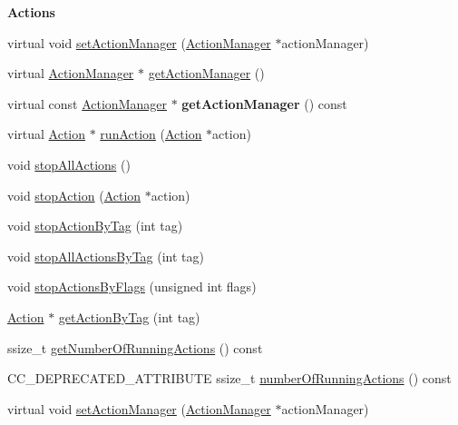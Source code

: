 \begin{Indent}\textbf{ Actions}\par
\begin{DoxyCompactItemize}
\item 
virtual void \hyperlink{classNode_a2807ac202214bee721a75c098da54bc6}{set\+Action\+Manager} (\hyperlink{classActionManager}{Action\+Manager} $\ast$action\+Manager)
\item 
virtual \hyperlink{classActionManager}{Action\+Manager} $\ast$ \hyperlink{classNode_a4e089841bc08a8753c65b7bb4f96aac5}{get\+Action\+Manager} ()
\item 
\mbox{\label{classNode_a5f453eebf3bf1a7a46ef4369f40ee8f1}} 
virtual const \hyperlink{classActionManager}{Action\+Manager} $\ast$ {\bfseries get\+Action\+Manager} () const
\item 
virtual \hyperlink{classAction}{Action} $\ast$ \hyperlink{classNode_a07b8c313d5c753c5dbabbe68c77f3128}{run\+Action} (\hyperlink{classAction}{Action} $\ast$action)
\item 
void \hyperlink{classNode_a1d542784d864cffe325e9e32d180aa6d}{stop\+All\+Actions} ()
\item 
void \hyperlink{classNode_a7f07a11c8550f7be6b6215b56ab69723}{stop\+Action} (\hyperlink{classAction}{Action} $\ast$action)
\item 
void \hyperlink{classNode_a58833aec8d21bf1ed647865c220c7c49}{stop\+Action\+By\+Tag} (int tag)
\item 
void \hyperlink{classNode_a70f8518979a58094c1ed2dbbe7ebcb9f}{stop\+All\+Actions\+By\+Tag} (int tag)
\item 
void \hyperlink{classNode_a36eef67f2b7d8026328d452e9a5ab09c}{stop\+Actions\+By\+Flags} (unsigned int flags)
\item 
\hyperlink{classAction}{Action} $\ast$ \hyperlink{classNode_ad26f8b3ec382080393b96921e3a38ad8}{get\+Action\+By\+Tag} (int tag)
\item 
ssize\+\_\+t \hyperlink{classNode_a576446fef9c35a1a06535eb8949df2f3}{get\+Number\+Of\+Running\+Actions} () const
\item 
C\+C\+\_\+\+D\+E\+P\+R\+E\+C\+A\+T\+E\+D\+\_\+\+A\+T\+T\+R\+I\+B\+U\+TE ssize\+\_\+t \hyperlink{classNode_a7724086be31eda53304e6c9715f6fd21}{number\+Of\+Running\+Actions} () const
\item 
virtual void \hyperlink{classNode_a8736ca61076cf9e27267c51884890348}{set\+Action\+Manager} (\hyperlink{classActionManager}{Action\+Manager} $\ast$action\+Manager)
\item 

\end{DoxyCompactItemize}
\end{Indent}
